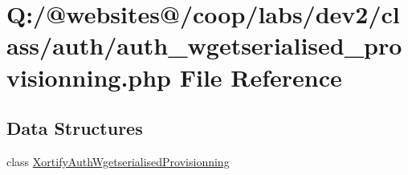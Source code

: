 \hypertarget{auth__wgetserialised__provisionning_8php}{\section{Q\-:/@websites@/coop/labs/dev2/class/auth/auth\-\_\-wgetserialised\-\_\-provisionning.php File Reference}
\label{auth__wgetserialised__provisionning_8php}
}
\subsection*{Data Structures}
\begin{DoxyCompactItemize}
\item 
class \hyperlink{class_xortify_auth_wgetserialised_provisionning}{Xortify\-Auth\-Wgetserialised\-Provisionning}
\end{DoxyCompactItemize}
